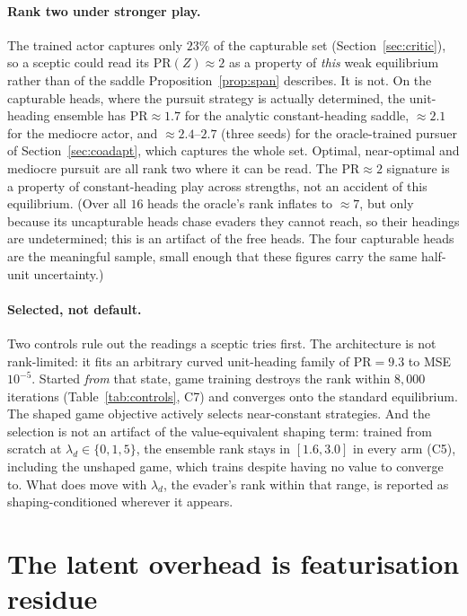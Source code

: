 \documentclass[twoside,11pt]{article}
\newcommand{\PR}{\mathrm{PR}}
\begin{document}
\paragraph{Rank two under stronger play.}  The trained actor captures
only $23\%$ of the capturable set (Section~\ref{sec:critic}), so a
sceptic could read its $\PR(Z) \approx 2$ as a property of \emph{this}
weak equilibrium rather than of the saddle Proposition~\ref{prop:span}
describes.  It is not.  On the capturable heads, where the pursuit
strategy is actually determined, the unit-heading ensemble has
$\PR \approx 1.7$ for the analytic constant-heading saddle,
$\approx 2.1$ for the mediocre actor, and $\approx 2.4$--$2.7$ (three
seeds) for the oracle-trained pursuer of Section~\ref{sec:coadapt},
which captures the whole set.  Optimal, near-optimal and mediocre
pursuit are all rank two where it can be read.  The $\PR \approx 2$
signature is a property of constant-heading play across strengths, not
an accident of this equilibrium.  (Over all $16$ heads the oracle's
rank inflates to $\approx 7$, but only because its uncapturable heads
chase evaders they cannot reach, so their headings are undetermined;
this is an artifact of the free heads.  The four capturable heads are
the meaningful sample, small enough that these figures carry the same
half-unit uncertainty.)

\paragraph{Selected, not default.}  Two controls rule out the readings
a sceptic tries first.  The architecture is not rank-limited: it fits
an arbitrary curved unit-heading family of $\PR = 9.3$ to MSE
$10^{-5}$.  Started \emph{from} that state, game training destroys the
rank within $8{,}000$ iterations (Table~\ref{tab:controls}, C7) and
converges onto the standard equilibrium.  The shaped game objective
actively selects near-constant strategies.  And the selection is not
an artifact of the value-equivalent shaping term: trained from scratch
at $\lambda_d \in \{0, 1, 5\}$, the ensemble rank stays in
$[1.6, 3.0]$ in every arm (C5), including the unshaped game, which
trains despite having no value to converge to.  What does move with
$\lambda_d$, the evader's rank within that range, is reported as
shaping-conditioned wherever it appears.

\section{The latent overhead is featurisation residue}
\label{sec:featurisation}
\end{document}
